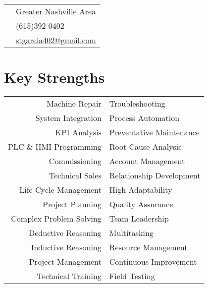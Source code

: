 \documentclass[10pt]{article} %
\begin{document}
\begin{minipage}[t]{0.44\textwidth} %
\vspace{0pt} %


\colorbox{shade}{\textcolor{text1}{
\begin{tabular}{c|p{7cm}}
\raisebox{-2pt}{\textifsymbol{18}} & Greater Nashville Area \\ %
\raisebox{-1pt}{\Mobilefone} & (615)392-0402 \\ %
\raisebox{-1pt}{\Letter} & \href{mailto:stgarcia402@gmail.com}{stgarcia402@gmail.com} \\ %
\end{tabular}
}
}\smallskip


\section{Key Strengths} 

\begin{tabular}{rl}
Machine Repair & Troubleshooting \\
System Integration & Process Automation \\
KPI Analysis & Preventative Maintenance \\
PLC \& HMI Programming & Root Cause Analysis \\
Commissioning & Account Management \\
Technical Sales & Relationship Development \\
Life Cycle Management & High Adaptability \\
Project Planning & Quality Assurance \\
Complex Problem Solving & Team Leadership \\
Deductive Reasoning & Multitasking \\
Inductive Reasoning & Resource Management \\
Project Management & Continuous Improvement \\ 
Technical Training & Field Testing \\
\end{tabular}


\end{minipage}
\end{document}
